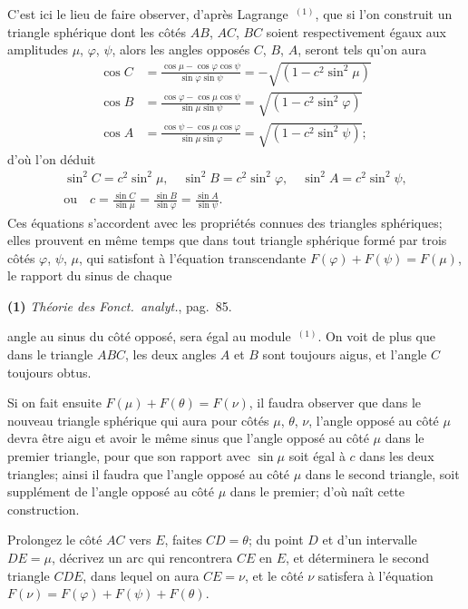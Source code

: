 \documentclass{article}
\begin{document}
C'est ici le lieu de faire observer, d'après Lagrange~${}^{(1)}$, que si l'on construit un triangle sphérique dont les côtés $AB$, $AC$, $BC$ soient respectivement égaux aux amplitudes $\mu$, $\varphi$, $\psi$, alors les angles opposés $C$, $B$, $A$, seront tels qu'on aura
\[ \begin{aligned} \cos C&=\frac{\cos\mu-\cos\varphi\cos\psi}{\sin\varphi\sin\psi}=-\sqrt{(1-c^{2}\sin^{2}\mu)}\\ \cos B&=\frac{\cos\varphi-\cos\mu\cos\psi}{\sin\mu\sin\psi}=\sqrt{(1-c^{2}\sin^{2}\varphi)}\\ \cos A&=\frac{\cos\psi-\cos\mu\cos\varphi}{\sin\mu\sin\varphi}=\sqrt{(1-c^{2}\sin^{2}\psi)}; \end{aligned} \]
d'où l'on déduit
\[ \begin{gathered} \sin^{2}C=c^{2}\sin^{2}\mu,\quad\sin^{2}B=c^{2}\sin^{2}\varphi,\quad\sin^{2}A=c^{2}\sin^{2}\psi,\\ \text{ou}\quad c=\frac{\sin C}{\sin\mu}=\frac{\sin B}{\sin\varphi}=\frac{\sin A}{\sin\psi}. \end{gathered} \]
Ces équations s'accordent avec les propriétés connues des triangles sphériques; elles prouvent en même temps que dans tout triangle sphérique formé par trois côtés $\varphi$, $\psi$, $\mu$, qui satisfont à l'équation transcendante $F(\varphi)+F(\psi)=F(\mu)$, le rapport du sinus de chaque

\textbf{(1)} \emph{Théorie des Fonct.\ analyt.}, pag.\ 85.

angle au sinus du côté opposé, sera égal au module~${}^{(1)}$. On voit de plus que dans le triangle $ABC$, les deux angles $A$ et $B$ sont toujours aigus, et l'angle $C$ toujours obtus.

Si on fait ensuite $F(\mu)+F(\theta)=F(\nu)$, il faudra observer que dans le nouveau triangle sphérique qui aura pour côtés $\mu$, $\theta$, $\nu$, l'angle opposé au côté $\mu$ devra être aigu et avoir le même sinus que l'angle opposé au côté $\mu$ dans le premier triangle, pour que son rapport avec $\sin\mu$ soit égal à $c$ dans les deux triangles; ainsi il faudra que l'angle opposé au côté $\mu$ dans le second triangle, soit supplément de l'angle opposé au côté $\mu$ dans le premier; d'où naît cette construction.

Prolongez le côté $AC$ vers $E$, faites $CD=\theta$; du point $D$ et d'un intervalle $DE=\mu$, décrivez un arc qui rencontrera $CE$ en $E$, et déterminera le second triangle $CDE$, dans lequel on aura $CE=\nu$, et le côté $\nu$ satisfera à l'équation $F(\nu)=F(\varphi)+F(\psi)+F(\theta)$.
\end{document}
